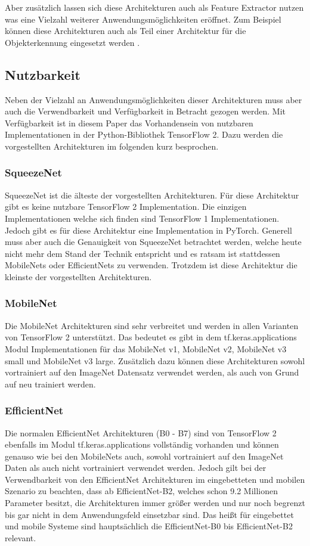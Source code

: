 \documentclass[conference]{IEEEtran}
\begin{document}
Aber zusätzlich lassen sich diese Architekturen auch als Feature Extractor nutzen was eine Vielzahl weiterer Anwendungsmöglichkeiten eröffnet. Zum Beispiel können diese Architekturen auch als Teil einer Architektur für die Objekterkennung eingesetzt werden \cite{b9}.

\subsection{Nutzbarkeit}
Neben der Vielzahl an Anwendungsmöglichkeiten dieser Architekturen muss aber auch die Verwendbarkeit und Verfügbarkeit in Betracht gezogen werden.
Mit Verfügbarkeit ist in diesem Paper das Vorhandensein von nutzbaren Implementationen in der Python-Bibliothek TensorFlow 2.
Dazu werden die vorgestellten Architekturen im folgenden kurz besprochen.

\subsubsection{SqueezeNet}
SqueezeNet ist die älteste der vorgestellten Architekturen. Für diese Architektur gibt es keine nutzbare TensorFlow 2 Implementation. Die einzigen Implementationen welche sich finden sind TensorFlow 1 Implementationen. Jedoch gibt es für diese Architektur eine Implementation in PyTorch. Generell muss aber auch die Genauigkeit von SqueezeNet betrachtet werden, welche heute nicht mehr dem Stand der Technik entspricht und es ratsam ist stattdessen MobileNets oder EfficientNets zu verwenden. Trotzdem ist diese Architektur die kleinste der vorgestellten Architekturen.

\subsubsection{MobileNet}
Die MobileNet Architekturen sind sehr verbreitet und werden in allen Varianten von TensorFlow 2 unterstützt. Das bedeutet es gibt in dem tf.keras.applications Modul Implementationen für das MobileNet v1, MobileNet v2, MobileNet v3 small und MobileNet v3 large. Zusätzlich dazu können diese Architekturen sowohl vortrainiert auf den ImageNet Datensatz verwendet werden, als auch von Grund auf neu trainiert werden.

\subsubsection{EfficientNet}
Die normalen EfficientNet Architekturen (B0 - B7) sind von TensorFlow 2 ebenfalls im Modul tf.keras.applications vollständig vorhanden und können genauso wie bei den MobileNets auch, sowohl vortrainiert auf den ImageNet Daten als auch nicht vortrainiert verwendet werden. Jedoch gilt bei der Verwendbarkeit von den EfficientNet Architekturen im eingebetteten und mobilen Szenario zu beachten, dass ab EfficientNet-B2, welches schon 9.2 Millionen Parameter besitzt, die Architekturen immer größer werden und nur noch begrenzt bis gar nicht in dem Anwendungsfeld einsetzbar sind. Das heißt für eingebettet und mobile Systeme sind hauptsächlich die EfficientNet-B0 bis EfficientNet-B2 relevant.
\end{document}
